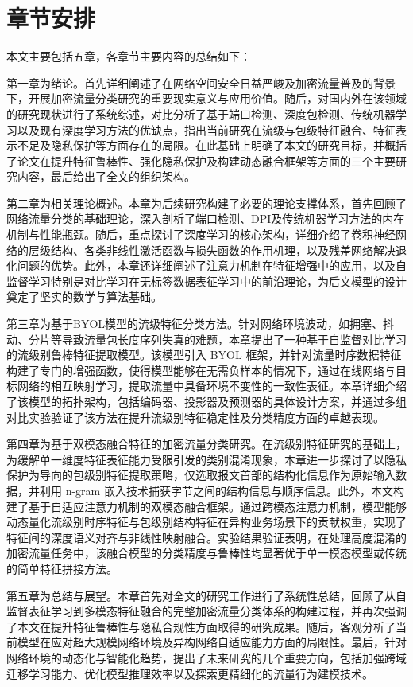 \section{章节安排}
本文主要包括五章，各章节主要内容的总结如下：

第一章为绪论。首先详细阐述了在网络空间安全日益严峻及加密流量普及的背景下，开展加密流量分类研究的重要现实意义与应用价值。随后，对国内外在该领域的研究现状进行了系统综述，对比分析了基于端口检测、深度包检测、传统机器学习以及现有深度学习方法的优缺点，指出当前研究在流级与包级特征融合、特征表示不足及隐私保护等方面存在的局限。在此基础上明确了本文的研究目标，并概括了论文在提升特征鲁棒性、强化隐私保护及构建动态融合框架等方面的三个主要研究内容，最后给出了全文的组织架构。

第二章为相关理论概述。本章为后续研究构建了必要的理论支撑体系，首先回顾了网络流量分类的基础理论，深入剖析了端口检测、DPI及传统机器学习方法的内在机制与性能瓶颈。随后，重点探讨了深度学习的核心架构，详细介绍了卷积神经网络的层级结构、各类非线性激活函数与损失函数的作用机理，以及残差网络解决退化问题的优势。此外，本章还详细阐述了注意力机制在特征增强中的应用，以及自监督学习特别是对比学习在无标签数据表征学习中的前沿理论，为后文模型的设计奠定了坚实的数学与算法基础。

第三章为基于BYOL模型的流级特征分类方法。针对网络环境波动，如拥塞、抖动、分片等导致流量包长度序列失真的难题，本章提出了一种基于自监督对比学习的流级别鲁棒特征提取模型。该模型引入 BYOL 框架，并针对流量时序数据特征构建了专门的增强函数，使得模型能够在无需负样本的情况下，通过在线网络与目标网络的相互映射学习，提取流量中具备环境不变性的一致性表征。本章详细介绍了该模型的拓扑架构，包括编码器、投影器及预测器的具体设计方案，并通过多组对比实验验证了该方法在提升流级别特征稳定性及分类精度方面的卓越表现。

第四章为基于双模态融合特征的加密流量分类研究。在流级别特征研究的基础上，为缓解单一维度特征表征能力受限引发的类别混淆现象，本章进一步探讨了以隐私保护为导向的包级别特征提取策略，仅选取报文首部的结构化信息作为原始输入数据，并利用 n-gram 嵌入技术捕获字节之间的结构信息与顺序信息。此外，本文构建了基于自适应注意力机制的双模态融合框架。通过跨模态注意力机制，模型能够动态量化流级别时序特征与包级别结构特征在异构业务场景下的贡献权重，实现了特征间的深度语义对齐与非线性映射融合。实验结果验证表明，在处理高度混淆的加密流量任务中，该融合模型的分类精度与鲁棒性均显著优于单一模态模型或传统的简单特征拼接方法。

第五章为总结与展望。本章首先对全文的研究工作进行了系统性总结，回顾了从自监督表征学习到多模态特征融合的完整加密流量分类体系的构建过程，并再次强调了本文在提升特征鲁棒性与隐私合规性方面取得的研究成果。随后，客观分析了当前模型在应对超大规模网络环境及异构网络自适应能力方面的局限性。最后，针对网络环境的动态化与智能化趋势，提出了未来研究的几个重要方向，包括加强跨域迁移学习能力、优化模型推理效率以及探索更精细化的流量行为建模技术。